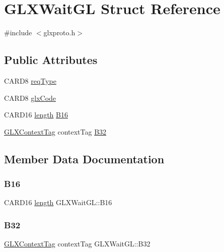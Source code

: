 \hypertarget{struct_g_l_x_wait_g_l}{}\section{G\+L\+X\+Wait\+GL Struct Reference}
\label{struct_g_l_x_wait_g_l}


{\ttfamily \#include $<$glxproto.\+h$>$}

\subsection*{Public Attributes}
\begin{DoxyCompactItemize}
\item 
C\+A\+R\+D8 \hyperlink{struct_g_l_x_wait_g_l_a96be1b4c9e3332f296ccb2bef4954457}{req\+Type}
\item 
C\+A\+R\+D8 \hyperlink{struct_g_l_x_wait_g_l_ad78bf34fd2e16e1215641c0793947e7d}{glx\+Code}
\item 
C\+A\+R\+D16 \hyperlink{glcorearb_8h_ab9c919755bde3b34349e23a32b4e0fa7}{length} \hyperlink{struct_g_l_x_wait_g_l_a4c62848d67fa0413465a25183ac8301c}{B16}
\item 
\hyperlink{glxproto_8h_ae71763ce00c9fa460beb4699af678691}{G\+L\+X\+Context\+Tag} context\+Tag \hyperlink{struct_g_l_x_wait_g_l_a18bc73b78729ffd422c6822de29336e7}{B32}
\end{DoxyCompactItemize}


\subsection{Member Data Documentation}
\mbox{\label{struct_g_l_x_wait_g_l_a4c62848d67fa0413465a25183ac8301c}} 
\subsubsection{\texorpdfstring{B16}{B16}}
{\footnotesize\ttfamily C\+A\+R\+D16 \hyperlink{glcorearb_8h_ab9c919755bde3b34349e23a32b4e0fa7}{length} G\+L\+X\+Wait\+G\+L\+::\+B16}

\mbox{\label{struct_g_l_x_wait_g_l_a18bc73b78729ffd422c6822de29336e7}} 
\subsubsection{\texorpdfstring{B32}{B32}}
{\footnotesize\ttfamily \hyperlink{glxproto_8h_ae71763ce00c9fa460beb4699af678691}{G\+L\+X\+Context\+Tag} context\+Tag G\+L\+X\+Wait\+G\+L\+::\+B32}


